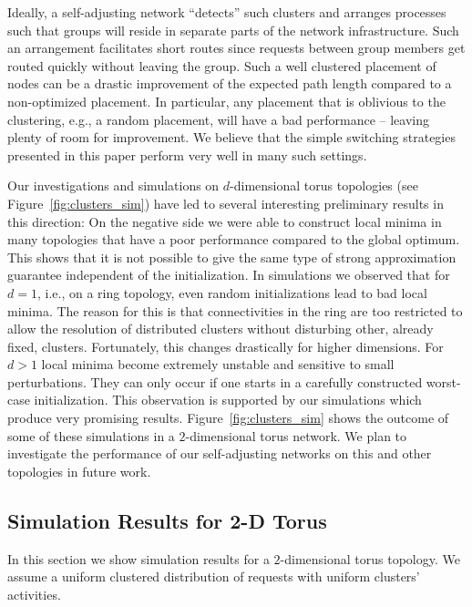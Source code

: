 \documentclass[conference]{IEEEtran}
\begin{document}
Ideally, a self-adjusting network ``detects'' such clusters and arranges processes such that groups will reside in separate parts of the network infrastructure. Such an arrangement facilitates short routes since requests between group members get routed quickly without leaving the group. Such a well clustered placement of nodes can be a drastic improvement of the expected path length compared to a non-optimized placement. In particular, any placement that is oblivious to the clustering, e.g., a random placement, will have a bad performance -- leaving plenty of room for improvement. We believe that the simple switching strategies presented in this paper perform very well in many such settings.

Our investigations and simulations on $d$-dimensional torus topologies (see Figure~\ref{fig:clusters_sim}) have led to several interesting preliminary results in this direction: On the negative side we were able to construct local minima in many topologies that have a poor performance compared to the global optimum. This shows that it is not possible to give the same type of strong approximation guarantee independent of the initialization. In simulations we observed that for $d=1$, i.e., on a ring topology, even random initializations lead to bad local minima. The reason for this is that connectivities in the ring are too restricted to allow the resolution of distributed clusters without disturbing other, already fixed, clusters. Fortunately, this changes drastically for higher dimensions. For  $d>1$ local minima become extremely unstable and sensitive to small perturbations. They can only occur if one starts in a carefully constructed worst-case initialization. This observation is supported by our simulations which produce very promising results. Figure~\ref{fig:clusters_sim} shows the outcome of some of these simulations in a $2$-dimensional torus network. We plan to investigate the performance of our self-adjusting networks on this and other topologies in future work. 
 

\subsection{Simulation Results for 2-D Torus}\label{app_simu_torus}

In this section we show simulation results for a $2$-dimensional torus topology. We assume a uniform clustered distribution of requests with uniform clusters' activities. 
\end{document}
